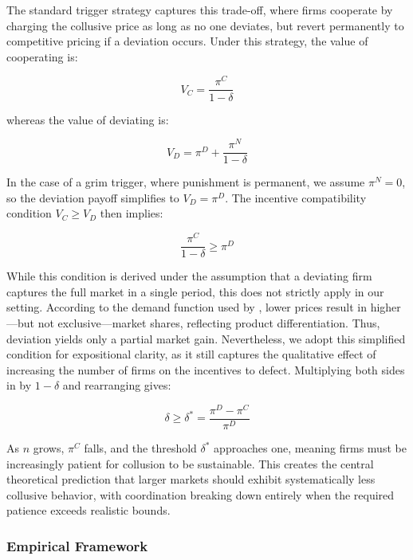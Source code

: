 The standard trigger strategy captures this trade-off, where firms cooperate by charging the collusive price as long as no one deviates, but revert permanently to competitive pricing if a deviation occurs. Under this strategy, the value of cooperating is:

\begin{equation}
    V_C = \frac{\pi^C}{1 - \delta}
\end{equation}

whereas the value of deviating is:

\begin{equation}
    V_D = \pi^D + \frac{\pi^N}{1 - \delta}
\end{equation}

In the case of a grim trigger, where punishment is permanent, we assume $\pi^N = 0$, so the deviation payoff simplifies to $V_D = \pi^D$. The incentive compatibility condition $V_C \geq V_D$ then implies:

\begin{equation}\label{eq:inc}
    \frac{\pi^C}{1 - \delta} \geq \pi^D
\end{equation}

While this condition is derived under the assumption that a deviating firm captures the full market in a single period, this does not strictly apply in our setting. According to the demand function used by \textcite{calvano_artificial_2020}, lower prices result in higher---but not exclusive---market shares, reflecting product differentiation. Thus, deviation yields only a partial market gain. Nevertheless, we adopt this simplified condition for expositional clarity, as it still captures the qualitative effect of increasing the number of firms on the incentives to defect. Multiplying both sides in  by $1 - \delta$ and rearranging gives:

\begin{equation}
    \delta \geq \delta^* = \frac{\pi^D - \pi^C}{\pi^D}
\end{equation}

As $n$ grows, $\pi^C$ falls, and the threshold $\delta^*$ approaches one, meaning firms must be increasingly patient for collusion to be sustainable. This creates the central theoretical prediction that larger markets should exhibit systematically less collusive behavior, with coordination breaking down entirely when the required patience exceeds realistic bounds.

\subsubsection*{Empirical Framework}


